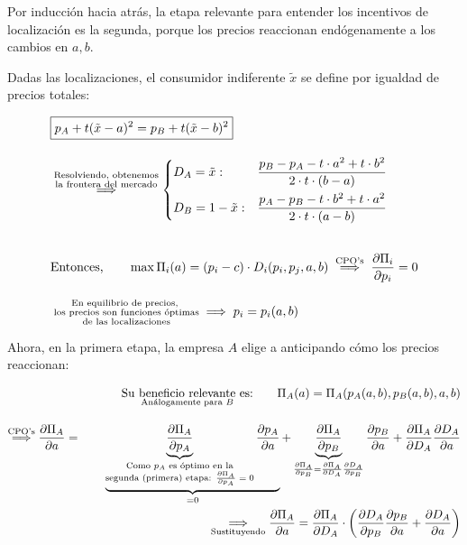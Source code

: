 \documentclass[10pt,a4paper]{article}
\begin{document}
Por inducción hacia atrás, la etapa relevante para entender los incentivos de localización es la segunda, porque los precios reaccionan endógenamente a los cambios en $a,b$. 

Dadas las localizaciones, el consumidor indiferente $\tilde x$ se define por igualdad de precios totales:

$$\begin{aligned}
    &\boxed{p_A+t(\tilde x-a)^2=p_B+t(\tilde x -b)^2}\\[1em]
    &\overset{\substack{\text{\scriptsize Resolviendo, obtenemos}\\\text{\scriptsize la frontera del mercado}}}{\Longrightarrow}\left\{\begin{aligned}
        &D_A=\tilde x:&&\frac{p_B-p_A-t\cdot a^2+t\cdot b^2}{2\cdot t\cdot (b-a)}\\
        &D_B=1-\tilde x: &&\frac{p_A-p_B-t\cdot b^2+t\cdot a^2}{2\cdot t\cdot (a-b)}\\
    \end{aligned}\right.\\[2em]
    &\text{Entonces,}\qquad \max \Pi_i(a)=(p_i-c)\cdot D_i(p_i,p_j,a,b)\;\overset{\text{\scriptsize CPO's}}{\Longrightarrow}\;\frac{\partial\Pi_i}{\partial p_i}=0\\[1em]
    &\substack{\text{En equilibrio de precios,}\\\text{ los precios son funciones óptimas}\\\text{ de las localizaciones}}\;\Longrightarrow\;p_i=p_i(a,b)
\end{aligned}$$
 
Ahora, en la primera etapa, la empresa $A$ elige a anticipando cómo los precios reaccionan:

$$\begin{aligned}
    \underset{\text{\scriptsize Análogamente para $B$}}{\text{Su beneficio relevante es:}}\qquad \Pi_A(a)=\Pi_A(p_A(a,b),p_B(a,b), a, b)\\[1em]
    \overset{\text{\scriptsize CPO's}}{\Longrightarrow} 
    \frac{\partial \Pi_A}{\partial a}=\qquad \underbrace{\underbrace{\frac{\partial \Pi_A}{\partial p_A}}_{\substack{\text{\scriptsize Como $p_A$ es óptimo en la}\\\text{\scriptsize segunda (primera) etapa: $\frac{\partial \Pi_A}{\partial p_A}=0$}}}\frac{\partial p_A}{\partial a}}_{=0}+\underbrace{\frac{\partial \Pi_A}{\partial p_B}}_{\frac{\partial \Pi_A}{\partial p_B}=\frac{\partial \Pi_A}{\partial D_A}\frac{\partial D_A}{\partial p_B}}\frac{\partial p_B}{\partial a}+\frac{\partial \Pi_A}{\partial D_A}\frac{\partial D_A}{\partial a}\\
    \underset{\text{\scriptsize Sustituyendo}}{\Longrightarrow}\frac{\partial \Pi_A}{\partial a}=\frac{\partial \Pi_A}{\partial D_A}\cdot \left(\frac{\partial D_A}{\partial p_B}\frac{\partial p_B}{\partial a}+\frac{\partial D_A}{\partial a}\right)
\end{aligned}$$
\end{document}
